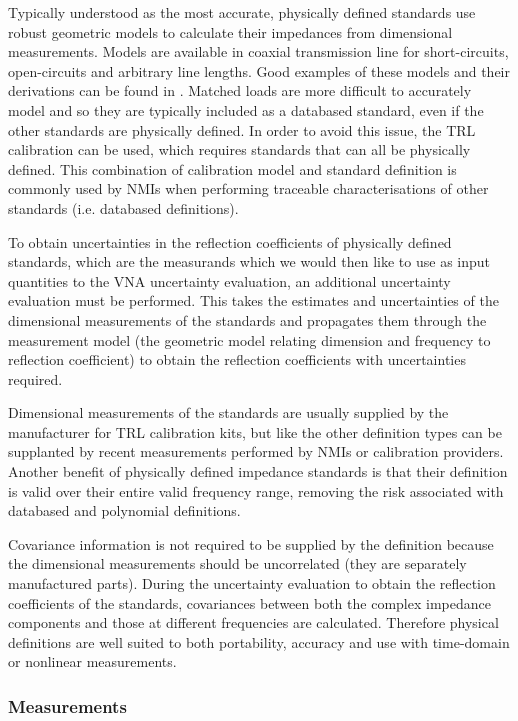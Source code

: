 \documentclass[../thesis/thesis.tex]{subfiles}
\begin{document}
Typically understood as the most accurate, physically defined standards use robust geometric models to calculate their impedances from dimensional measurements. Models are available in coaxial transmission line for short-circuits, open-circuits and arbitrary line lengths. Good examples of these models and their derivations can be found in \cites{Keysight_2016}[Appendix C]{Lewandowski_2010}. Matched loads are more difficult to accurately model and so they are typically included as a databased standard, even if the other standards are physically defined. In order to avoid this issue, the TRL calibration can be used, which requires standards that can all be physically defined. This combination of calibration model and standard definition is commonly used by NMIs when performing traceable characterisations of other standards (i.e. databased definitions).

To obtain uncertainties in the reflection coefficients of physically defined standards, which are the measurands which we would then like to use as input quantities to the VNA uncertainty evaluation, an additional uncertainty evaluation must be performed. This takes the estimates and uncertainties of the dimensional measurements of the standards and propagates them through the measurement model (the geometric model relating dimension and frequency to reflection coefficient) to obtain the reflection coefficients with uncertainties required.

Dimensional measurements of the standards are usually supplied by the manufacturer for TRL calibration kits, but like the other definition types can be supplanted by recent measurements performed by NMIs or calibration providers. Another benefit of physically defined impedance standards is that their definition is valid over their entire valid frequency range, removing the risk associated with databased and polynomial definitions.

Covariance information is not required to be supplied by the definition because the dimensional measurements should be uncorrelated (they are separately manufactured parts). During the uncertainty evaluation to obtain the reflection coefficients of the standards, covariances between both the complex impedance components and those at different frequencies are calculated. Therefore physical definitions are well suited to both portability, accuracy and use with time-domain or nonlinear measurements.

\subsubsection{Measurements}
\end{document}
